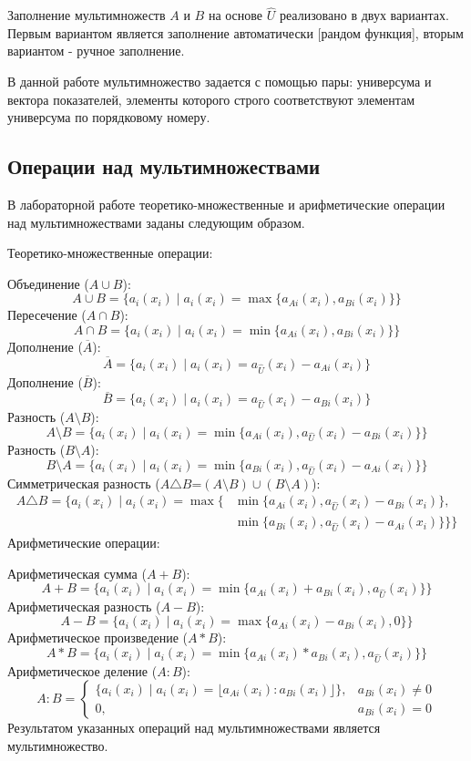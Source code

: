 \documentclass[14pt,a4paper]{extarticle}
\begin{document}
Заполнение мультимножеств $A$ и $B$ на основе $\hat{U}$ реализовано в двух вариантах. Первым вариантом является заполнение автоматически [рандом функция], вторым вариантом - ручное заполнение.

В данной работе мультимножество задается с помощью пары: универсума и вектора показателей, элементы которого строго соответствуют элементам универсума по порядковому номеру.

\subsection{Операции над мультимножествами}

В лабораторной работе теоретико-множественные и арифметические операции над мультимножествами заданы следующим образом.

Теоретико-множественные операции:

Объединение ($A \cup B$):
\[
A \cup B = \{a_i(x_i) \mid a_i(x_i) = \max\{a_{Ai}(x_i), a_{Bi}(x_i)\}\}
\]
Пересечение ($A \cap B$):
\[
A \cap B = \{a_i(x_i) \mid a_i(x_i) = \min\{a_{Ai}(x_i), a_{Bi}(x_i)\}\}
\]
Дополнение ($\overline{A}$):
\[
\overline{A} = \{a_i(x_i) \mid a_i(x_i) = a_{\hat{U}}(x_i) - a_{Ai}(x_i)\}
\]
Дополнение ($\overline{B}$):
\[
\overline{B} = \{a_i(x_i) \mid a_i(x_i) = a_{\hat{U}}(x_i) - a_{Bi}(x_i)\}
\]
Разность ($A \setminus B$):
\[
A \setminus B = \{a_i(x_i) \mid a_i(x_i) = \min\{a_{Ai}(x_i), a_{\hat{U}}(x_i) - a_{Bi}(x_i)\}\}
\]
Разность ($B \setminus A$):
\[
B \setminus A = \{a_i(x_i) \mid a_i(x_i) = \min\{a_{Bi}(x_i), a_{\hat{U}}(x_i) - a_{Ai}(x_i)\}\}
\]
Симметрическая разность ($A \triangle B$=$(A \setminus B) \cup (B \setminus A)$):
\[
\begin{aligned}
A \triangle B = \{a_i(x_i) \mid a_i(x_i) = \max\{&
\min\{a_{Ai}(x_i), a_{\hat{U}}(x_i) - a_{Bi}(x_i)\},\\
&\min\{a_{Bi}(x_i), a_{\hat{U}}(x_i) - a_{Ai}(x_i)\}\}\}
\end{aligned}
\]
Арифметические операции:

Арифметическая сумма ($A + B$):
\[
A + B = \{a_i(x_i) \mid a_i(x_i) = \min\{a_{Ai}(x_i) + a_{Bi}(x_i), a_{\hat{U}}(x_i)\}\}
\]
Арифметическая разность ($A - B$):
\[
A - B = \{a_i(x_i) \mid a_i(x_i) = \max\{a_{Ai}(x_i) - a_{Bi}(x_i), 0\}\}
\]
Арифметическое произведение ($A * B$):
\[
A * B = \{a_i(x_i) \mid a_i(x_i) = \min\{a_{Ai}(x_i) * a_{Bi}(x_i), a_{\hat{U}}(x_i)\}\}
\]
Арифметическое деление ($A : B$):
\[
A : B = \begin{cases}
\{a_i(x_i) \mid a_i(x_i) = \lfloor a_{Ai}(x_i) : a_{Bi}(x_i) \rfloor\}, & a_{Bi}(x_i) \neq 0 \\
0, & a_{Bi}(x_i) = 0
\end{cases}
\]
Результатом указанных операций над мультимножествами является мультимножество.
\end{document}
